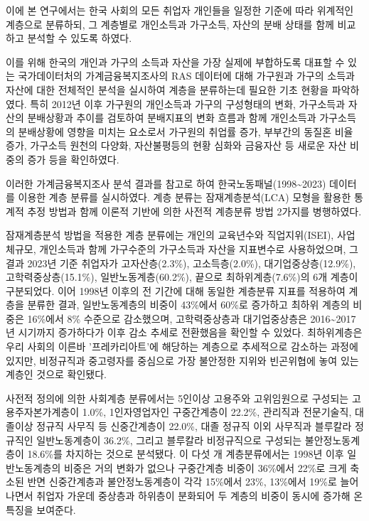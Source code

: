 \documentclass[
  letterpaper,
  DIV=11,
  numbers=noendperiod]{scrartcl}
\begin{document}
이에 본 연구에서는 한국 사회의 모든 취업자 개인들을 일정한 기준에 따라
위계적인 계층으로 분류하되, 그 계층별로 개인소득과 가구소득, 자산의 분배
상태를 함께 비교하고 분석할 수 있도록 하였다.

이를 위해 한국의 개인과 가구의 소득과 자산을 가장 실제에 부합하도록
대표할 수 있는 국가데이터처의 가계금융복지조사의 RAS 데이터에 대해
가구원과 가구의 소득과 자산에 대한 전체적인 분석을 실시하여 계층을
분류하는데 필요한 기초 현황을 파악하였다. 특히 2012년 이후 가구원의
개인소득과 가구의 구성형태의 변화, 가구소득과 자산의 분배상황과 추이를
검토하여 분배지표의 변화 흐름과 함께 개인소득과 가구소득의 분배상황에
영향을 미치는 요소로서 가구원의 취업률 증가, 부부간의 동질혼 비율 증가,
가구소득 원천의 다양화, 자산불평등의 현황 심화와 금융자산 등 새로운 자산
비중의 증가 등을 확인하였다.

이러한 가계금융복지조사 분석 결과를 참고로 하여
한국노동패널(1998\textasciitilde2023) 데이터를 이용한 계층 분류를
실시하였다. 계층 분류는 잠재계층분석(LCA) 모형을 활용한 통계적 추정
방법과 함께 이론적 기반에 의한 사전적 계층분류 방법 2가지를 병행하였다.

잠재계층분석 방법을 적용한 계층 분류에는 개인의 교육년수와
직업지위(ISEI), 사업체규모, 개인소득과 함께 가구수준의 가구소득과 자산을
지표변수로 사용하었으며, 그 결과 2023년 기준 취업자가 고자산층(2.3\%),
고소득층(2.0\%), 대기업중상층(12.9\%), 고학력중상층(15.1\%),
일반노동계층(60.2\%), 끝으로 최하위계층(7.6\%)의 6개 계층이 구분되었다.
이어 1998년 이후의 전 기간에 대해 동일한 계층분류 지표를 적용하여 계층을
분류한 결과, 일반노동계층의 비중이 43\%에서 60\%로 증가하고 최하위
계층의 비중은 16\%에서 8\% 수준으로 감소했으며, 고학력중상층과
대기업중상층은 2016\textasciitilde2017년 시기까지 증가하다가 이후 감소
추세로 전환했음을 확인할 수 있었다. 최하위계층은 우리 사회의 이른바
'프레카리아트'에 해당하는 계층으로 추세적으로 감소하는 과정에 있지만,
비정규직과 중고령자를 중심으로 가장 불안정한 지위와 빈곤위협에 놓여 있는
계층인 것으로 확인됐다.

사전적 정의에 의한 사회계층 분류에서는 5인이상 고용주와 고위임원으로
구성되는 고용주자본가계층이 1.0\%, 1인자영업자인 구중간계층이 22.2\%,
관리직과 전문기술직, 대졸이상 정규직 사무직 등 신중간계층이 22.0\%, 대졸
정규직 이외 사무직과 블루칼라 정규직인 일반노동계층이 36.2\%, 그리고
블루칼라 비정규직으로 구성되는 불안정노동계층이 18.6\%를 차지하는 것으로
분석됐다. 이 다섯 개 계층분류에서는 1998년 이후 일반노동계층의 비중은
거의 변화가 없으나 구중간계층 비중이 36\%에서 22\%로 크게 축소된 반면
신중간계층과 불안정노동계층이 각각 15\%에서 23\%, 13\%에서 19\%로
늘어나면서 취업자 가운데 중상층과 하위층이 분화되어 두 계층의 비중이
동시에 증가해 온 특징을 보여준다.
\end{document}
